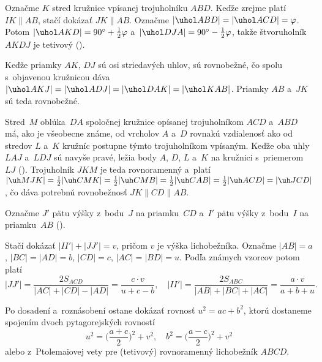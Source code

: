 {%
Označme $K$ stred kružnice vpísanej trojuholníku $ABD$.
Keďže zrejme platí $IK \parallel AB$, stačí dokázať $JK \parallel
AB$. Označme $|\uhol ABD|=|\uhol ACD|=\varphi$. Potom $|\uhol
AKD|=90^\circ+\frac12\varphi$ a~$|\uhol DJA|=90^\circ-\frac12\varphi$,
takže štvoruholník $AKDJ$ je tetivový (\obr).
%

Keďže priamky $AK$, $DJ$ sú osi striedavých uhlov, sú rovnobežné,
čo spolu s~objavenou kružnicou dáva $|\uhol AKJ|=|\uhol ADJ|=|\uhol DAK|=|\uhol KAB|$.
Priamky $AB$ a~$JK$ sú teda rovnobežné.

\poznamka
Stred~$M$ oblúka~$DA$ spoločnej kružnice opísanej trojuholníkom $ACD$ a~$ABD$ má,
ako je všeobecne známe, od vrcholov $A$ a~$D$ rovnakú vzdialenosť ako od stredov $L$ a~$K$
kružníc postupne týmto trojuholníkom vpísaným. Keďže oba uhly $LAJ$ a~$LDJ$ sú navyše
pravé, ležia body $A$, $D$, $L$ a~$K$ na kružnici s~priemerom~$LJ$ (\obr).
Trojuholník $JKM$ je teda rovnoramenný a~platí
$|\uh MJK|=\frac12|\uh CMK|=\frac12|\uh CMB|=\frac12|\uh CAB|=\frac12|\uh ACD|=|\uh JCD|$, čo
dáva potrebnú rovnobežnosť ${JK\parallel CD\parallel AB}$.
%

\ineriesenie
Označme $J'$ pätu výšky z~bodu~$J$ na priamku~$CD$
a~$I'$ pätu výšky z~bodu~$I$ na priamku~$AB$ (\obr).
%

Stačí dokázať $|II'|+|JJ'|=v$, pričom $v$ je výška lichobežníka.
Označme $|AB|=a$, $|BC|=|AD|=b$, $|CD|=c$, $|AC|=|BD|=u$.
Podľa známych vzorcov potom platí
$$
|JJ'|=\frac{2S_{ACD}}{|AC|+|CD|-|AD|}=\frac{c\cdot v}{u+c-b},\quad
|II'|=\frac{2S_{ABC}}{|AB|+|BC|+|AC|}=\frac{a\cdot v}{a+b+u}.
$$

Po dosadení a~roznásobení ostane dokázať rovnosť $u^2=ac+b^2$, ktorú dostaneme
spojením dvoch pytagorejských rovností
$$
u^2=\Big(\frac{a+c}{2}\Big)^{\!2}+v^2,\quad
b^2=\Big(\frac{a-c}{2}\Big)^{\!2}+v^2
$$
alebo z~Ptolemaiovej vety pre (tetivový) rovnoramenný lichobežník $ABCD$.}

